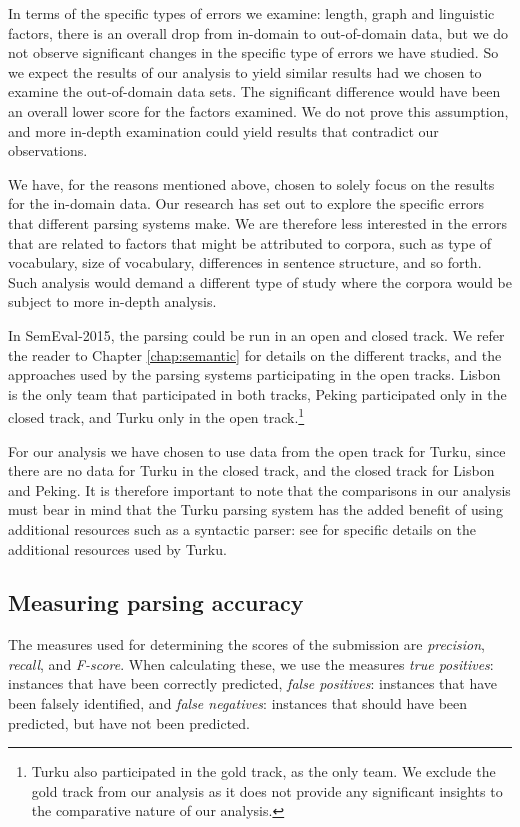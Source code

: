 In terms of the specific types of errors we examine: length, graph and linguistic factors, there is an overall drop from in-domain to out-of-domain data, but we do not observe significant changes in the specific type of errors we have studied. So we expect the results of our analysis to yield similar results had we chosen to examine the out-of-domain data sets. The significant difference would have been an overall lower score for the factors examined. We do not prove this assumption, and more in-depth examination could yield results that contradict our observations.

We have, for the reasons mentioned above, chosen to solely focus on the results for the in-domain data. Our research has set out to explore the specific errors that different parsing systems make. We are therefore less interested in the errors that are related to factors that might be attributed to corpora, such as type of vocabulary, size of vocabulary, differences in sentence structure, and so forth. Such analysis would demand a different type of study where the corpora would be subject to more in-depth analysis.

In SemEval-2015, the parsing could be run in an open and closed track. We refer the reader to Chapter \ref{chap:semantic} for details on the different tracks, and the approaches used by the parsing systems participating in the open tracks. Lisbon is the only team that participated in both tracks, Peking participated only in the closed track, and Turku only in the open track.\footnote{Turku also participated in the gold track, as the only team. We exclude the gold track from our analysis as it does not provide any significant insights to the comparative nature of our analysis.} 

For our analysis we have chosen to use data from the open track for Turku, since there are no data for Turku in the closed track, and the closed track for Lisbon and Peking. It is therefore important to note that the comparisons in our analysis must bear in mind that the Turku parsing system has the added benefit of using additional resources such as a syntactic parser: see  for specific details on the additional resources used by Turku.

\subsection{Measuring parsing accuracy}

The measures used for determining the scores of the submission are \textit{precision}, \textit{recall}, and \textit{F-score}. When calculating these, we use the measures \textit{true positives}: instances that have been correctly predicted, \textit{false positives}: instances that have been falsely identified, and \textit{false negatives}: instances that should have been predicted, but have not been predicted.

